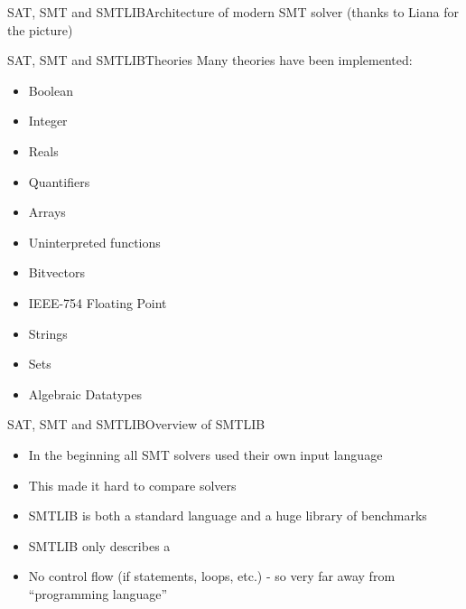 \documentclass{beamer}
\begin{document}
\begin{frame}{SAT, SMT and SMTLIB}{Architecture of modern SMT solver (thanks to Liana for the picture)}
  \begin{center}
  \end{center}
\end{frame}

\begin{frame}{SAT, SMT and SMTLIB}{Theories}
  Many theories have been implemented:
  \begin{itemize}
  \item Boolean
  \item Integer
  \item Reals
  \item Quantifiers
  \item Arrays
  \item Uninterpreted functions
  \item Bitvectors
  \item IEEE-754 Floating Point
  \item Strings
  \item Sets
  \item Algebraic Datatypes
  \end{itemize}
\end{frame}

\begin{frame}{SAT, SMT and SMTLIB}{Overview of SMTLIB}
  \begin{itemize}
  \item In the beginning all SMT solvers used their own input language
  \item This made it hard to compare solvers
  \item SMTLIB is both a standard language and a huge library of benchmarks
  \item SMTLIB only describes a 
  \item No control flow (if statements, loops, etc.) - so very far
    away from ``programming language''
  \end{itemize}
\end{frame}
\end{document}
